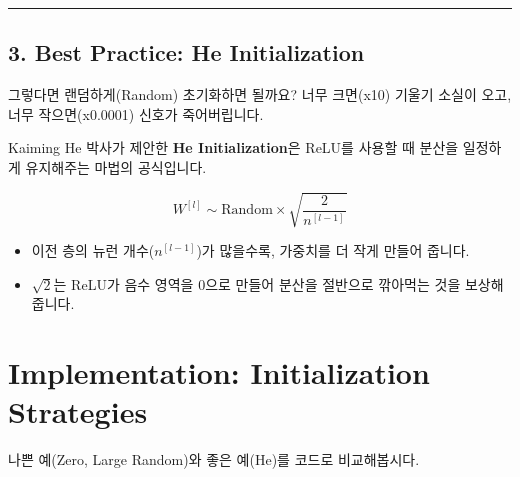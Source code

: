 \documentclass[11pt,a4paper]{book}
\theoremstyle{definition}
\begin{document}
\vspace{0.5cm}\hrule\vspace{0.5cm}

\subsection{3. Best Practice: He Initialization}
그렇다면 랜덤하게(Random) 초기화하면 될까요? 
너무 크면(x10) 기울기 소실이 오고, 너무 작으면(x0.0001) 신호가 죽어버립니다.


Kaiming He 박사가 제안한 \textbf{He Initialization}은 ReLU를 사용할 때 분산을 일정하게 유지해주는 마법의 공식입니다.

$$ W^{[l]} \sim \text{Random} \times \sqrt{\frac{2}{n^{[l-1]}}} $$
\begin{itemize}
    \item 이전 층의 뉴런 개수($n^{[l-1]}$)가 많을수록, 가중치를 더 작게 만들어 줍니다.
    \item $\sqrt{2}$는 ReLU가 음수 영역을 0으로 만들어 분산을 절반으로 깎아먹는 것을 보상해줍니다.
\end{itemize}

\section{Implementation: Initialization Strategies}

나쁜 예(Zero, Large Random)와 좋은 예(He)를 코드로 비교해봅시다.
\end{document}

